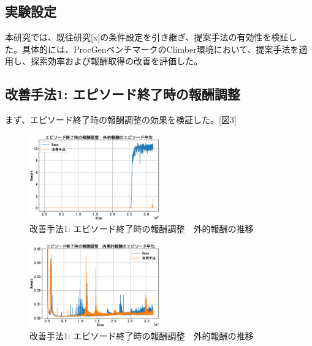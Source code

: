 \subsection{実験設定}
本研究では、既往研究[x]の条件設定を引き継ぎ、提案手法の有効性を検証した。具体的には、ProcGenベンチマークのClimber環境において、提案手法を適用し、探索効率および報酬取得の改善を評価した。

\subsection{改善手法1: エピソード終了時の報酬調整}
まず、エピソード終了時の報酬調整の効果を検証した。[図3]
\begin{figure}[t]
   \centering
   \includegraphics[width=0.5\textwidth]{Method1_Ext.eps}
   \caption{改善手法1: エピソード終了時の報酬調整　外的報酬の推移}\label{fig3:figure3}
\end{figure}
\begin{figure}[t]
   \centering
   \includegraphics[width=0.5\textwidth]{Method1_Intr.eps}
   \caption{改善手法1: エピソード終了時の報酬調整　外的報酬の推移}\label{fig4:figure4}
\end{figure}

